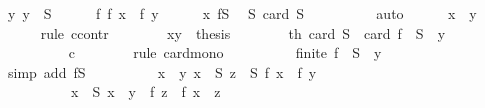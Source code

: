 \begin{isabellebody}
\ y{\isacharcolon}{\kern0pt}\ {\isachardoublequoteopen}y\ {\isasymin}\ S{\isachardoublequoteclose}\isanewline
\ \ \ \ \isamarkupfalse%
\ f{\isacharcolon}{\kern0pt}\ {\isachardoublequoteopen}f\ x\ {\isacharequal}{\kern0pt}\ f\ y{\isachardoublequoteclose}\isanewline
\ \ \ \ \isamarkupfalse%
\ x\ fS\ \isamarkupfalse%
\ S{}{\isacharcolon}{\kern0pt}\ {\isachardoublequoteopen}card\ S\ {\isasymnoteq}\ {}{\isachardoublequoteclose}\isanewline
\ \ \ \ \ \ \isamarkupfalse%
\ auto\isanewline
\ \ \ \ \isamarkupfalse%
\ {\isachardoublequoteopen}x\ {\isacharequal}{\kern0pt}\ y{\isachardoublequoteclose}\isanewline
\ \ \ \ \isamarkupfalse%
\ {\isacharparenleft}{\kern0pt}rule\ ccontr{\isacharparenright}{\kern0pt}\isanewline
\ \ \ \ \ \ \isamarkupfalse%
\ xy{\isacharcolon}{\kern0pt}\ {\isachardoublequoteopen}{\isasymnot}\ {\isacharquery}{\kern0pt}thesis{\isachardoublequoteclose}\isanewline
\ \ \ \ \ \ \isamarkupfalse%
\ th{\isacharcolon}{\kern0pt}\ {\isachardoublequoteopen}card\ S\ {\isasymle}\ card\ {\isacharparenleft}{\kern0pt}f\ {\isacharbackquote}{\kern0pt}\ {\isacharparenleft}{\kern0pt}S\ {\isacharminus}{\kern0pt}\ {\isacharbraceleft}{\kern0pt}y{\isacharbraceright}{\kern0pt}{\isacharparenright}{\kern0pt}{\isacharparenright}{\kern0pt}{\isachardoublequoteclose}\isanewline
\ \ \ \ \ \ \ \ \isamarkupfalse%
\ c\isanewline
\ \ \ \ \ \ \isamarkupfalse%
\ {\isacharparenleft}{\kern0pt}rule\ card{\isacharunderscore}{\kern0pt}mono{\isacharparenright}{\kern0pt}\isanewline
\ \ \ \ \ \ \ \ \isamarkupfalse%
\ {\isachardoublequoteopen}finite\ {\isacharparenleft}{\kern0pt}f\ {\isacharbackquote}{\kern0pt}\ {\isacharparenleft}{\kern0pt}S\ {\isacharminus}{\kern0pt}\ {\isacharbraceleft}{\kern0pt}y{\isacharbraceright}{\kern0pt}{\isacharparenright}{\kern0pt}{\isacharparenright}{\kern0pt}{\isachardoublequoteclose}\isanewline
\ \ \ \ \ \ \ \ \ \ \isamarkupfalse%
\ {\isacharparenleft}{\kern0pt}simp\ add{\isacharcolon}{\kern0pt}\ fS{\isacharparenright}{\kern0pt}\isanewline
\ \ \ \ \ \ \ \ \isamarkupfalse%
\ {\isachardoublequoteopen}{\isasymlbrakk}x\ {\isasymnoteq}\ y{\isacharsemicolon}{\kern0pt}\ x\ {\isasymin}\ S{\isacharsemicolon}{\kern0pt}\ z\ {\isasymin}\ S{\isacharsemicolon}{\kern0pt}\ f\ x\ {\isacharequal}{\kern0pt}\ f\ y{\isasymrbrakk}\isanewline
\ \ \ \ \ \ \ \ \ {\isasymLongrightarrow}\ {\isasymexists}x\ {\isasymin}\ S{\isachardot}{\kern0pt}\ x\ {\isasymnoteq}\ y\ {\isasymand}\ f\ z\ {\isacharequal}{\kern0pt}\ f\ x{\isachardoublequoteclose}\ \ z\isanewline

\end{isabellebody}
